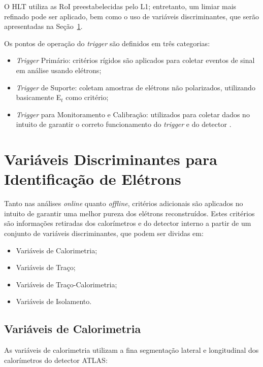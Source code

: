 O HLT utiliza as RoI preestabelecidas pelo L1; entretanto, um limiar mais refinado pode ser aplicado, bem como o uso de variáveis discriminantes, que serão apresentadas na Seção~\ref{sec:var_dis}.

Os pontos de operação do \emph{trigger} são definidos em três categorias:

\begin{itemize}
  \item \emph{Trigger} Primário: critérios rígidos são aplicados para coletar eventos de sinal em análise usando elétrons;
  \item \emph{Trigger} de Suporte: coletam amostras de elétrons não polarizados, utilizando basicamente E${_t}$ como critério;
  \item \emph{Trigger} para Monitoramento e Calibração: utilizados para coletar dados no intuito de garantir o correto funcionamento do \emph{trigger} e do detector \cite{aad2012performance}.
\end{itemize}


\section{Variáveis Discriminantes para Identificação de Elétrons}\label{sec:var_dis}

Tanto nas análises \emph{online} quanto \emph{offline}, critérios adicionais são aplicados no intuito de garantir uma melhor pureza dos elétrons reconstruídos. Estes critérios são informações retiradas dos calorímetros e do detector interno \cite{atlas2011expected} a partir de um conjunto de variáveis discriminantes, que podem ser dividas em:

\begin{itemize}
  \item Variáveis de Calorimetria;
  \item Variáveis de Traço;
  \item Variáveis de Traço-Calorimetria;
  \item Variáveis de Isolamento.
\end{itemize}

\subsection{Variáveis de Calorimetria}

As variáveis de calorimetria utilizam a fina segmentação lateral e longitudinal dos calorímetros do detector ATLAS:

